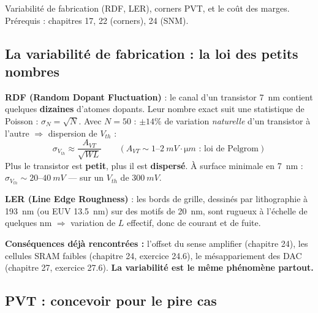 \documentclass[12pt,a4paper,twoside]{book}
\begin{document}
\begin{approfondissement}
Variabilité de fabrication (RDF, LER), corners PVT, et le coût des marges. Prérequis : chapitres 17, 22 (corners), 24 (SNM).
\end{approfondissement}

\subsection{La variabilité de fabrication : la loi des petits nombres}

\begin{formule}
\textbf{RDF (Random Dopant Fluctuation)} : le canal d'un transistor \SI{7}{nm} contient quelques \textbf{dizaines} d'atomes dopants. Leur nombre exact suit une statistique de Poisson : $\sigma_N = \sqrt{N}$. Avec $N = 50$ : $\pm 14\%$ de variation \textit{naturelle} d'un transistor à l'autre $\Rightarrow$ dispersion de $V_{th}$ :
\[
\sigma_{V_{th}} \approx \frac{A_{VT}}{\sqrt{W L}} \qquad (A_{VT} \sim 1\text{--}\SI{2}{mV\cdot\micro m} \text{ : loi de Pelgrom})
\]
Plus le transistor est \textbf{petit}, plus il est \textbf{dispersé}. À surface minimale en \SI{7}{nm} : $\sigma_{V_{th}} \sim 20$--$\SI{40}{mV}$ --- sur un $V_{th}$ de $\SI{300}{mV}$.

\textbf{LER (Line Edge Roughness)} : les bords de grille, dessinés par lithographie à \SI{193}{nm} (ou EUV \SI{13.5}{nm}) sur des motifs de \SI{20}{nm}, sont rugueux à l'échelle de quelques nm $\Rightarrow$ variation de $L$ effectif, donc de courant et de fuite.

\textbf{Conséquences déjà rencontrées :} l'offset du sense amplifier (chapitre 24), les cellules SRAM faibles (chapitre 24, exercice 24.6), le mésappariement des DAC (chapitre 27, exercice 27.6). \textbf{La variabilité est le même phénomène partout.}
\end{formule}

\subsection{PVT : concevoir pour le pire cas}
\end{document}
